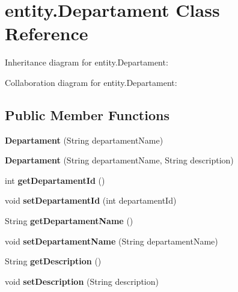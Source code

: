 \hypertarget{classentity_1_1_departament}{}\section{entity.\+Departament Class Reference}
\label{classentity_1_1_departament}


Inheritance diagram for entity.\+Departament\+:


Collaboration diagram for entity.\+Departament\+:
\subsection*{Public Member Functions}
\begin{DoxyCompactItemize}
\item 
\mbox{\label{classentity_1_1_departament_aec9250edf629eef8fe894067d971ca31}} 
{\bfseries Departament} (String departament\+Name)
\item 
\mbox{\label{classentity_1_1_departament_acf35748b896b5c73a01f66a90730c825}} 
{\bfseries Departament} (String departament\+Name, String description)
\item 
\mbox{\label{classentity_1_1_departament_a29e8f0360c520cb00f508dd54624a492}} 
int {\bfseries get\+Departament\+Id} ()
\item 
\mbox{\label{classentity_1_1_departament_a51620d4b993b36fd01f411c65cd61424}} 
void {\bfseries set\+Departament\+Id} (int departament\+Id)
\item 
\mbox{\label{classentity_1_1_departament_adbee38a0bafc3844b7eb60cf00caabc7}} 
String {\bfseries get\+Departament\+Name} ()
\item 
\mbox{\label{classentity_1_1_departament_a55b2b5b68dd47bfb4907c1156b505fa6}} 
void {\bfseries set\+Departament\+Name} (String departament\+Name)
\item 
\mbox{\label{classentity_1_1_departament_a5332bf92f5b29d56e9559037f3c6f4a2}} 
String {\bfseries get\+Description} ()
\item 
\mbox{\label{classentity_1_1_departament_a4ffc7e3a45ab3a5878e3c1fa65695078}} 
void {\bfseries set\+Description} (String description)
\end{DoxyCompactItemize}


